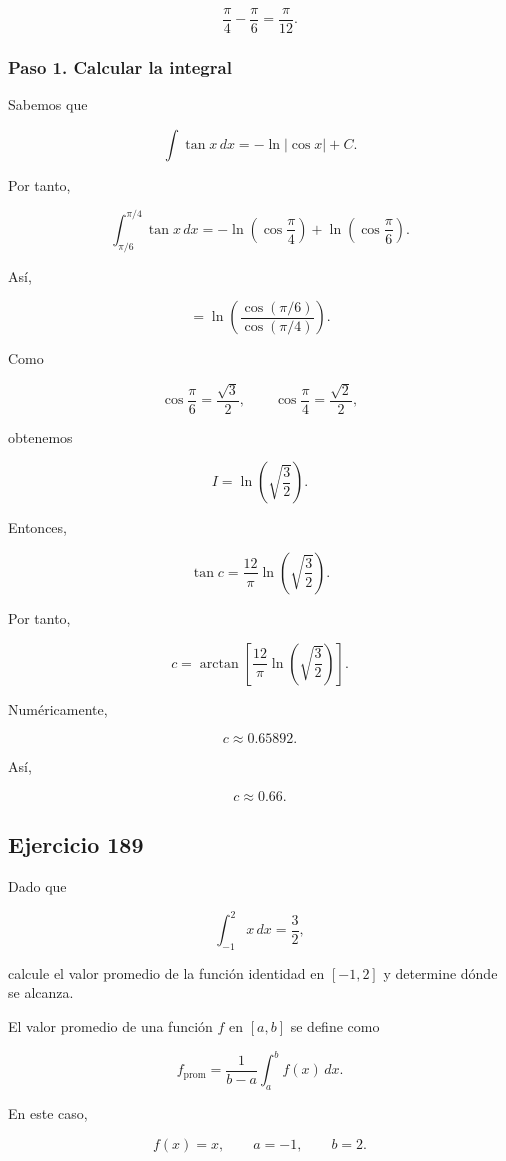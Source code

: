 \documentclass[12pt]{article}
\begin{document}
\[
\frac{\pi}{4}-\frac{\pi}{6}
=
\frac{\pi}{12}.
\]

\subsubsection*{Paso 1. Calcular la integral}

Sabemos que

\[
\int\tan x\,dx=-\ln|\cos x|+C.
\]

Por tanto,

\[
\int_{\pi/6}^{\pi/4}\tan x\,dx
=
-\ln\left(\cos\frac{\pi}{4}\right)
+
\ln\left(\cos\frac{\pi}{6}\right).
\]

Así,

\[
=
\ln
\left(
\frac{\cos(\pi/6)}{\cos(\pi/4)}
\right).
\]

Como

\[
\cos\frac{\pi}{6}=\frac{\sqrt3}{2},
\qquad
\cos\frac{\pi}{4}=\frac{\sqrt2}{2},
\]

obtenemos

\[
I
=
\ln\left(\sqrt{\frac32}\right).
\]

Entonces,

\[
\tan c
=
\frac{12}{\pi}
\ln\left(\sqrt{\frac32}\right).
\]

Por tanto,

\[
c
=
\arctan
\left[
\frac{12}{\pi}
\ln\left(\sqrt{\frac32}\right)
\right].
\]

Numéricamente,

\[
c\approx0.65892.
\]

Así,

\[
\boxed{c\approx0.66}.
\]

\subsection*{Ejercicio 189}

Dado que

\[
\int_{-1}^{2}x\,dx=\frac32,
\]

calcule el valor promedio de la función identidad en \([-1,2]\) y
determine dónde se alcanza.

El valor promedio de una función \(f\) en \([a,b]\) se define como

\[
f_{\mathrm{prom}}
=
\frac{1}{b-a}
\int_a^bf(x)\,dx.
\]

En este caso,

\[
f(x)=x,
\qquad
a=-1,
\qquad
b=2.
\]
\end{document}
